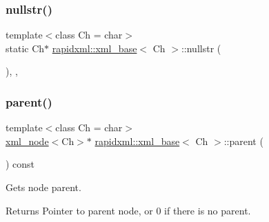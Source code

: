 \mbox{\label{classrapidxml_1_1xml__base_ad96ff6b1e41dab3ff60b9bc4df769a75}} 
\subsubsection{\texorpdfstring{nullstr()}{nullstr()}\hspace{0.1cm}{\footnotesize\ttfamily [2/2]}}
{\footnotesize\ttfamily template$<$class Ch  = char$>$ \\
static Ch$\ast$ \mbox{\hyperlink{classrapidxml_1_1xml__base}{rapidxml\+::xml\+\_\+base}}$<$ Ch $>$\+::nullstr (\begin{DoxyParamCaption}{ }\end{DoxyParamCaption})\hspace{0.3cm}{\ttfamily [inline]}, {\ttfamily [static]}, {\ttfamily [protected]}}

\mbox{\label{classrapidxml_1_1xml__base_aa807062868d671a8c798d9d1bf016988}} 
\subsubsection{\texorpdfstring{parent()}{parent()}\hspace{0.1cm}{\footnotesize\ttfamily [1/2]}}
{\footnotesize\ttfamily template$<$class Ch  = char$>$ \\
\mbox{\hyperlink{classrapidxml_1_1xml__node}{xml\+\_\+node}}$<$Ch$>$$\ast$ \mbox{\hyperlink{classrapidxml_1_1xml__base}{rapidxml\+::xml\+\_\+base}}$<$ Ch $>$\+::parent (\begin{DoxyParamCaption}{ }\end{DoxyParamCaption}) const\hspace{0.3cm}{\ttfamily [inline]}}

Gets node parent. \begin{DoxyReturn}{Returns}
Pointer to parent node, or 0 if there is no parent. 
\end{DoxyReturn}
\mbox{\label{classrapidxml_1_1xml__base_aa807062868d671a8c798d9d1bf016988}} 
